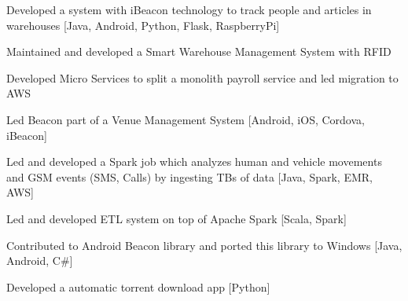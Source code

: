 \documentclass[]{furkanvarol-resume}
\begin{document}
\begin{minipage}[t]{0.66\textwidth}
\begin{tightemize}
\item Developed a system with iBeacon technology to track people and articles in warehouses
[Java, Android, Python, Flask, RaspberryPi]
\item Maintained and developed a Smart Warehouse Management System with RFID 
\end{tightemize}
\sectionsep


\descript{}
\location{\qquad}
\vspace{-1.3em} %
\begin{tightemize}
\item Developed Micro Services to split a monolith payroll service and led migration to AWS
\item Led Beacon part of a Venue Management System [Android, iOS, Cordova, iBeacon]
\item Led and developed a Spark job which analyzes human and vehicle movements and GSM events (SMS, Calls) by ingesting TBs of data [Java, Spark, EMR, AWS]
\end{tightemize}
\sectionsep


\descript{}
\location{\qquad}
\vspace{-1.3em} %
\begin{tightemize}
\item Led and developed ETL system on top of Apache Spark [Scala, Spark]
\item Contributed to Android Beacon library and ported this library to Windows [Java, Android, C\#]
\item Developed a automatic torrent download app [Python]
\end{tightemize}
\sectionsep



\end{minipage}
\end{document}
